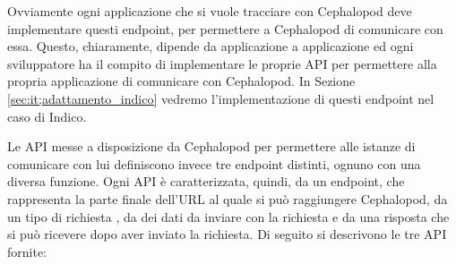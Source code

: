             Ovviamente ogni applicazione che si vuole tracciare con Cephalopod deve implementare questi endpoint, per permettere a Cephalopod di comunicare con essa. Questo, chiaramente, dipende da applicazione a applicazione ed ogni sviluppatore ha il compito di implementare le proprie \ac{API} per permettere alla propria applicazione di comunicare con Cephalopod. In Sezione \ref{sec:it;adattamento_indico} vedremo l'implementazione di questi endpoint nel caso di Indico.
            
            Le \ac{API} messe a disposizione da Cephalopod per permettere alle istanze di comunicare con lui definiscono invece tre endpoint distinti, ognuno con una diversa funzione. Ogni \ac{API} è caratterizzata, quindi, da un endpoint, che rappresenta la parte finale dell'\ac{URL} al quale si può raggiungere Cephalopod, da un tipo di richiesta , da dei dati da inviare con la richiesta e da una risposta che si può ricevere dopo aver inviato la richiesta. Di seguito si descrivono le tre \ac{API} fornite: 
            
